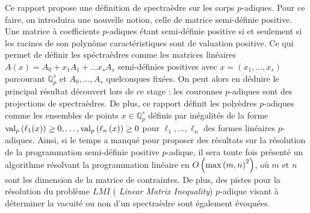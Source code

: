 Ce rapport propose une définition de spectraèdre sur les corps $p$-adiques. Pour ce faire, on introduira une nouvelle notion, celle de matrice semi-définie positive. Une matrice à coefficients $p$-adiques étant semi-définie positive si et seulement si les racines de son polynôme caractéristiques sont de valuation positive. Ce qui permet de définir les spéctraèdres comme les matrices linéaires $A(x) = A_0 + x_1 A_1 + \ldots x_s A_s$ semi-définies positives avec $x = \left( x_1,\ldots,x_s \right)$ parcourant $\mathbb{Q}_{p} ^s$ et $A_0,\ldots,A_s$ quelconques fixées. On peut alors en déduire le principal résultat découvert lors de ce stage : les couronnes $p$-adiques sont des projections de spectraèdres. De plus, ce rapport définit les polyèdres $p$-adiques comme les ensembles de points $x \in \mathbb{Q}_{p} ^s$ définis par inégalités de la forme $\text{val}_p\left( \ell_1(x)\right)\ge 0,\ldots, \text{val}_p\left( \ell_n\left( x \right) \right)\ge 0$ pour $\ell_1,\ldots, \ell_n$ des formes linéaires $p$-adiques.
Ainsi, si le temps a manqué pour proposer des résultats sur la résolution de la programmation semi-définie positive $p$-adique, il sera toute fois présenté un algorithme résolvant la programmation linéaire en $O\left( \max\left( m,n \right)^2 \right) $, où $m$ et $n$ sont les dimension de la matrice de contraintes. De plus, des pistes pour la résolution du problème $LMI$ ( \textit{Linear Matrix Inequality}) $p$-adique visant à déterminer la vacuité ou non d'un spectraèdre sont également évoquées. 
